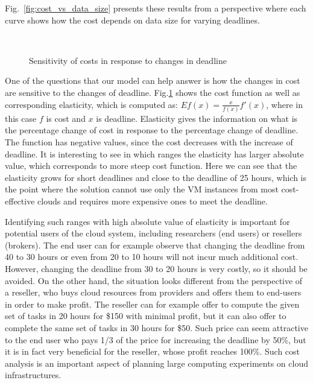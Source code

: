 {  Fig.~\ref{fig:cost_vs_data_size} presents these results from a perspective
  where each curve shows how the cost depends on data size for varying
  deadlines.
  
  \begin{figure}[tb]
     \centering {}\\
     \caption{Sensitivity of costs in response to changes in deadline}
     \label{fig:elasticity}
  \end{figure} 
  
  One of the questions that our model can help answer is how the changes in
  cost are sensitive to the changes of deadline. Fig.\ref{fig:elasticity} shows
  the cost function as well as corresponding elasticity, which is computed as:
  $E f(x) = \frac{x}{f(x)} f'(x)$, where in this case $f$ is cost and $x$ is
  deadline. Elasticity gives the information on what is the percentage change
  of cost in response to the percentage change of deadline. The function has
  negative values, since the cost decreases with the increase of deadline. It
  is interesting to see in which ranges the elasticity has larger absolute
  value, which corresponds to more steep cost function. Here we can see that
  the elasticity grows for short deadlines and close to the deadline of 25
  hours, which is the point where the solution cannot use only the VM instances
  from most cost-effective clouds and requires more expensive ones to meet the
  deadline.
  
  Identifying such ranges with high absolute value of elasticity is important
  for potential users of the cloud system, including researchers (end users) or
  resellers (brokers). The end user can for example observe that changing the
  deadline from 40 to 30 hours or even from 20 to 10 hours will not incur much
  additional cost. However, changing the deadline from 30 to 20 hours is very
  costly, so it should be avoided. On the other hand, the situation looks
  different from the perspective of a reseller, who buys cloud resources from
  providers and offers them to end-users in order to make profit. The reseller
  can for example offer to compute the given set of tasks in 20 hours for \$150
  with minimal profit, but it can also offer to complete the same set of tasks
  in 30 hours for \$50. Such price can seem attractive to the end user who pays
  1/3 of the price for increasing the deadline by 50\%, but it is in fact very
  beneficial for the reseller, whose profit reaches 100\%. Such cost analysis
  is an important aspect of planning large computing experiments on cloud
  infrastructures.

}
